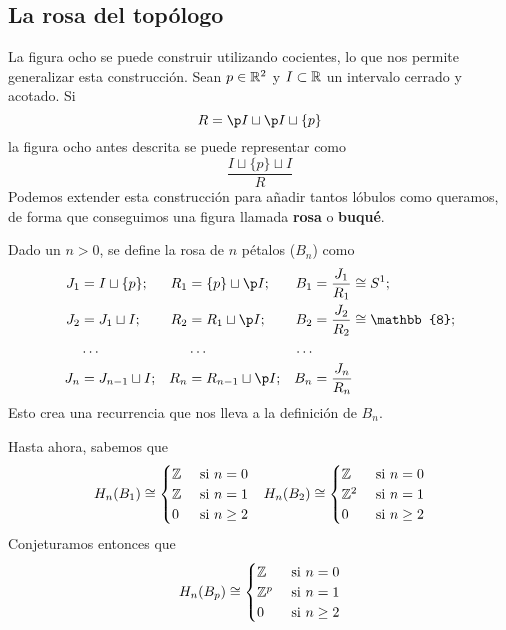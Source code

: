 \subsection{La rosa del topólogo}
La figura ocho se puede construir utilizando cocientes, lo que nos permite
generalizar esta construcción. Sean $p \in \mathbb{R}^2$ y $I \subset \mathbb{R}$
un intervalo cerrado y acotado. Si
\[R=\p I\sqcup \p I\sqcup \{p\}\]
la figura ocho antes descrita se puede representar como
\[\frac{I\sqcup\{p\}\sqcup I}{R}\]
Podemos extender esta construcción para añadir tantos lóbulos como queramos,
de forma que conseguimos una figura llamada \textbf{rosa} o \textbf{buqué}.

Dado un $n > 0$, se define la rosa de $n$ pétalos ($B_n$) como
\begin{align*}
J_1	&=I\sqcup \{p\}; 	& R_1	&=\{p\}\sqcup \p I;		&
B_1	&=\frac{J_1}{R_1}\cong S^1;\\
J_2	&=J_1\sqcup I;		& R_2	&=R_1\sqcup \p I; 		&
B_2	&=\frac{J_2}{R_2}\cong \mathbb{8};\\
	&\hdots				& 		&\hdots					&
\hdots\\
J_n	&=J_{n-1}\sqcup I;	& R_n	&=R_{n-1}\sqcup \p I;	&
B_n	&=\frac{J_n}{R_n}
\end{align*}
Esto crea una recurrencia que nos lleva a la definición de $B_n$.

Hasta ahora, sabemos que
\begin{align*}
H_n(B_1)\cong
\begin{cases}
\mathbb{Z}	&\mbox{ si $n =0$}\\
\mathbb{Z}	&\mbox{ si $n =1$}\\
0    	&\mbox{ si $n \geq 2$}
\end{cases}
&&
H_n(B_2)\cong
\begin{cases}
\mathbb{Z}		&\mbox{ si $n =0$}\\
\mathbb{Z}^2 	&\mbox{ si $n =1$}\\
0		    &\mbox{ si $n \geq 2$}
\end{cases}
\end{align*}
Conjeturamos entonces que
\[H_n(B_p)\cong
\begin{cases}
\mathbb{Z}		&\mbox{ si $n =0$}\\
\mathbb{Z}^p	&\mbox{ si $n =1$}\\
0     &\mbox{ si $n \geq 2$}
\end{cases}\]


